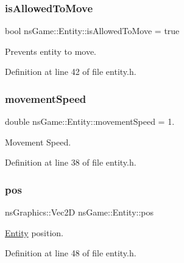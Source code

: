 \subsubsection{\texorpdfstring{is\+Allowed\+To\+Move}{isAllowedToMove}}
{\footnotesize\ttfamily bool ns\+Game\+::\+Entity\+::is\+Allowed\+To\+Move = true}



Prevents entity to move. 



Definition at line 42 of file entity.\+h.

\mbox{\label{structns_game_1_1_entity_a2b5d83f01bdc1d58673b3fae9afe704e}} 
\subsubsection{\texorpdfstring{movement\+Speed}{movementSpeed}}
{\footnotesize\ttfamily double ns\+Game\+::\+Entity\+::movement\+Speed = 1.\hspace{0.3cm}{\ttfamily [protected]}}



Movement Speed. 



Definition at line 38 of file entity.\+h.

\mbox{\label{structns_game_1_1_entity_a1ad359bb31e86c4971fd96b080ed43c4}} 
\subsubsection{\texorpdfstring{pos}{pos}}
{\footnotesize\ttfamily ns\+Graphics\+::\+Vec2D ns\+Game\+::\+Entity\+::pos}



\hyperlink{structns_game_1_1_entity}{Entity} position. 



Definition at line 48 of file entity.\+h.

\mbox{\label{structns_game_1_1_entity_aaf71fbc10979dcc5b5af55fcb6e44216}} 
